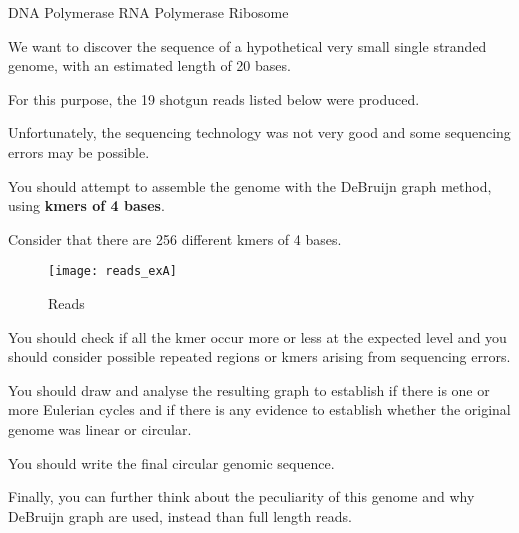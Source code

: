 \begin{Answer} [
  ref={ex3},
  number={3}
 ]

  \Question DNA Polymerase
  \Question RNA Polymerase
  \Question Ribosome
\end{Answer}

\begin{Exercise} [
  title={DeBruijn assembly},
  difficulty={2},
  label={exA},
  origin={G. Valle}
 ]

We want to discover the sequence of a hypothetical very small single stranded
genome, with an estimated length of 20 bases.

For this purpose, the 19 shotgun reads listed below were produced.

Unfortunately, the sequencing technology was not very good and some sequencing
errors may be possible.

You should attempt to assemble the genome with the DeBruijn graph method,
using \textbf{kmers of 4 bases}.

Consider that there are 256 different kmers of 4 bases.

\begin{figure}[H]
  \centering
  \texttt{[image: reads\_exA]}
  \caption{Reads}
  \label{fig:reads}
\end{figure}

  \Question You should check if all the kmer occur more or less at the expected
level and you should consider possible repeated regions or kmers arising from
sequencing errors.

  \Question You should draw and analyse the resulting graph to establish if
there is one or more Eulerian cycles and if there is any evidence to establish
whether the original genome was linear or circular.

  \Question You should write the final circular genomic sequence.

Finally, you can further think about the peculiarity of this genome and why
DeBruijn graph are used, instead than full length reads.
\end{Exercise}

